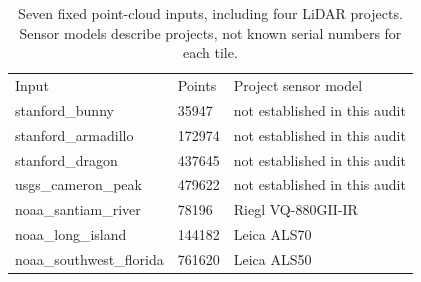 \begin{table}[tbp]\centering\scriptsize
\caption{Seven fixed point-cloud inputs, including four LiDAR projects. Sensor models describe projects, not known serial numbers for each tile.}
\begin{tabular}{lll}
\hline
Input & Points & Project sensor model \\
stanford\_bunny & 35947 & not established in this audit \\
stanford\_armadillo & 172974 & not established in this audit \\
stanford\_dragon & 437645 & not established in this audit \\
usgs\_cameron\_peak & 479622 & not established in this audit \\
noaa\_santiam\_river & 78196 & Riegl VQ-880GII-IR \\
noaa\_long\_island & 144182 & Leica ALS70 \\
noaa\_southwest\_florida & 761620 & Leica ALS50 \\
\hline
\end{tabular}
\end{table}
